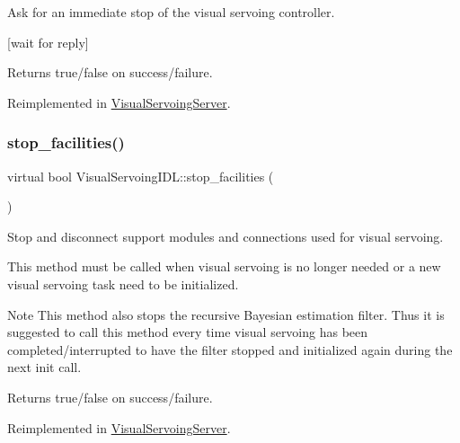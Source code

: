 Ask for an immediate stop of the visual servoing controller. 

\mbox{[}wait for reply\mbox{]} \begin{DoxyReturn}{Returns}
true/false on success/failure. 
\end{DoxyReturn}


Reimplemented in \hyperlink{classVisualServoingServer_ac8d5b33c4ae61707e121c5154a973ab8}{Visual\+Servoing\+Server}.

\mbox{\label{classVisualServoingIDL_a777cc1a83b3c0ae3dd86e36a0298970e}} 
\subsubsection{\texorpdfstring{stop\+\_\+facilities()}{stop\_facilities()}}
{\footnotesize\ttfamily virtual bool Visual\+Servoing\+I\+D\+L\+::stop\+\_\+facilities (\begin{DoxyParamCaption}{ }\end{DoxyParamCaption})\hspace{0.3cm}{\ttfamily [virtual]}}



Stop and disconnect support modules and connections used for visual servoing. 

This method must be called when visual servoing is no longer needed or a new visual servoing task need to be initialized. \begin{DoxyNote}{Note}
This method also stops the recursive Bayesian estimation filter. Thus it is suggested to call this method every time visual servoing has been completed/interrupted to have the filter stopped and initialized again during the next init call. 
\end{DoxyNote}
\begin{DoxyReturn}{Returns}
true/false on success/failure. 
\end{DoxyReturn}


Reimplemented in \hyperlink{classVisualServoingServer_ae5e4ac8d334374f2de259a530781443b}{Visual\+Servoing\+Server}.

\mbox{\label{classVisualServoingIDL_aa751cf35650259ae7cff331c9d19c694}} 
